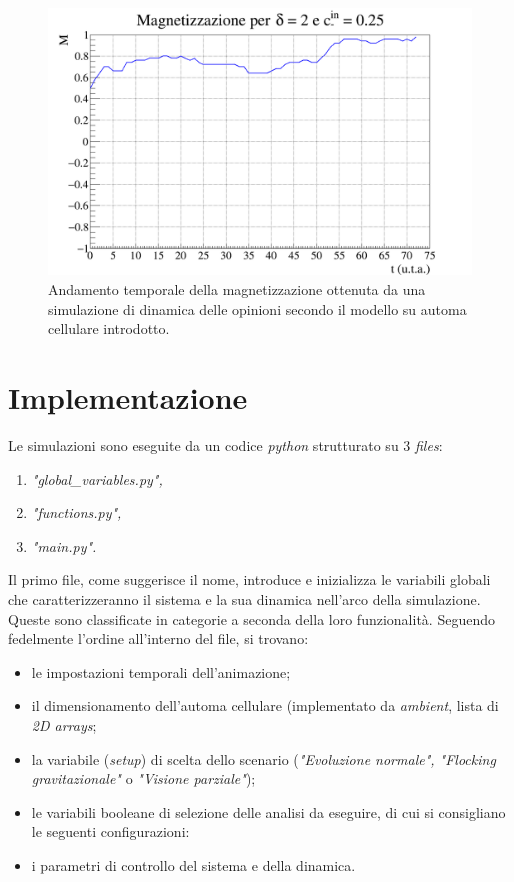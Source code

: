 \documentclass[letterpaper,10pt]{article}
\begin{document}
\begin{figure}[h]
\centering
\includegraphics[width = \linewidth]{Immagini/poland_sim_magnetization_graph.png}
\caption{Andamento temporale della magnetizzazione ottenuta da una simulazione di dinamica delle opinioni secondo il modello su automa cellulare introdotto. }
\label{Fig:23}
\end{figure}

\section{Implementazione}
\label{Sec:5}

Le simulazioni sono eseguite da un codice \textit{python} strutturato su 3 \textit{files}:

\begin{enumerate}
  \item \textit{"global\_variables.py",}
  \item \textit{"functions.py",}
  \item \textit{"main.py".}
\end{enumerate}

Il primo file, come suggerisce il nome, introduce e inizializza le variabili globali che caratterizzeranno il sistema e la sua dinamica nell'arco della simulazione. Queste sono classificate in categorie a seconda della loro funzionalità. Seguendo fedelmente l'ordine all'interno del file, si trovano:

\begin{itemize}
  \item le impostazioni temporali dell'animazione;
  \item il dimensionamento dell'automa cellulare (implementato da \textit{ambient}, lista di \textit{2D arrays};
  \item la variabile (\textit{setup}) di scelta dello scenario (\textit{"Evoluzione normale", "Flocking gravitazionale"} o \textit{"Visione parziale"});
  \item le variabili booleane di selezione delle analisi da eseguire, di cui si consigliano le seguenti configurazioni:
  \item i parametri di controllo del sistema e della dinamica.
\end{itemize}
\end{document}
